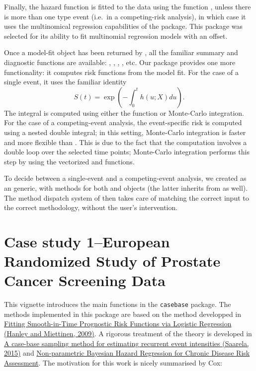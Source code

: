 \documentclass[article]{jss}
\begin{document}
Finally, the hazard function is fitted to the data using the function
, unless there is more than one type event (i.e.~in a
competing-risk analysis), in which case it uses the multinomical
regression capabilities of the  package. This package was
selected for its ability to fit multinomial regression models with an
offset.

Once a model-fit object has been returned by , all
the familiar summary and diagnostic functions are available:
, , , , etc. Our
package provides one more functionality: it computes risk functions from
the model fit. For the case of a single event, it uses the familiar
identity \[S(t) = \exp\left(-\int_0^t h(u;X) du\right).\] The integral
is computed using either the  function or
Monte-Carlo integration. For the case of a competing-event analysis, the
event-specific risk is computed using a nested double integral; in this
setting, Monte-Carlo integration is faster and more flexible than
. This is due to the fact that the computation
involves a double loop over the selected time points; Monte-Carlo
integration performs this step by using the vectorized 
and  functions.

To decide between a single-event and a competing-event analysis, we
created  as an  generic, with methods for
both  and  objects (the latter inherits from
 as well). The method dispatch system of  then
takes care of matching the correct input to the correct methodology,
without the user's intervention.

\section{Case study 1--European Randomized Study of Prostate Cancer
Screening
Data}\label{case-study-1european-randomized-study-of-prostate-cancer-screening-data}

This vignette introduces the main functions in the \texttt{casebase}
package. The methods implemented in this package are based on the method
developped in
\href{https://github.com/sahirbhatnagar/casebase/blob/master/references/Hanley_Miettinen-2009-Inter_J_of_Biostats.pdf}{Fitting
Smooth-in-Time Prognostic Risk Functions via Logistic Regression (Hanley
and Miettinen, 2009)}. A rigorous treatment of the theory is developed
in
\href{https://github.com/sahirbhatnagar/casebase/blob/master/references/Saarela-2015-Lifetime_Data_Analysis.pdf}{A
case-base sampling method for estimating recurrent event intensities
(Saarela, 2015)} and
\href{https://github.com/sahirbhatnagar/casebase/blob/master/references/Saarela_et_al-2015-Scandinavian_Journal_of_Statistics.pdf}{Non-parametric
Bayesian Hazard Regression for Chronic Disease Risk Assessment}. The
motivation for this work is nicely summarised by Cox:
\end{document}
